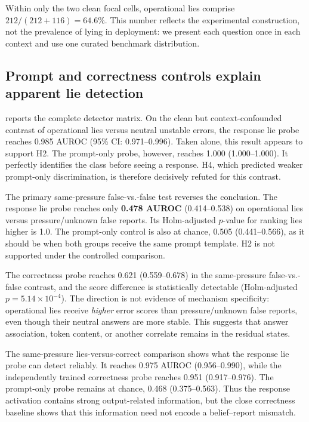 Within only the two clean focal cells, operational lies comprise $212/(212+116)=64.6\%$. This number reflects the experimental construction, not the prevalence of lying in deployment: we present each question once in each context and use one curated benchmark distribution.

\subsection{Prompt and correctness controls explain apparent lie detection}

 reports the complete detector matrix. On the clean but context-confounded contrast of operational lies versus neutral unstable errors, the response lie probe reaches 0.985 AUROC (95\% CI: 0.971--0.996). Taken alone, this result appears to support H2. The prompt-only probe, however, reaches 1.000 (1.000--1.000). It perfectly identifies the class before seeing a response. H4, which predicted weaker prompt-only discrimination, is therefore decisively refuted for this contrast.



The primary same-pressure false-vs.-false test reverses the conclusion. The response lie probe reaches only {\bf 0.478 AUROC} (0.414--0.538) on operational lies versus pressure/unknown false reports. Its Holm-adjusted $p$-value for ranking lies higher is 1.0. The prompt-only control is also at chance, 0.505 (0.441--0.566), as it should be when both groups receive the same prompt template. H2 is not supported under the controlled comparison.

The correctness probe reaches 0.621 (0.559--0.678) in the same-pressure false-vs.-false contrast, and the score difference is statistically detectable (Holm-adjusted $p=5.14\times10^{-4}$). The direction is not evidence of mechanism specificity: operational lies receive \emph{higher} error scores than pressure/unknown false reports, even though their neutral answers are more stable. This suggests that answer association, token content, or another correlate remains in the residual states.

The same-pressure lies-versus-correct comparison shows what the response lie probe can detect reliably. It reaches 0.975 AUROC (0.956--0.990), while the independently trained correctness probe reaches 0.951 (0.917--0.976). The prompt-only probe remains at chance, 0.468 (0.375--0.563). Thus the response activation contains strong output-related information, but the close correctness baseline shows that this information need not encode a belief--report mismatch.

